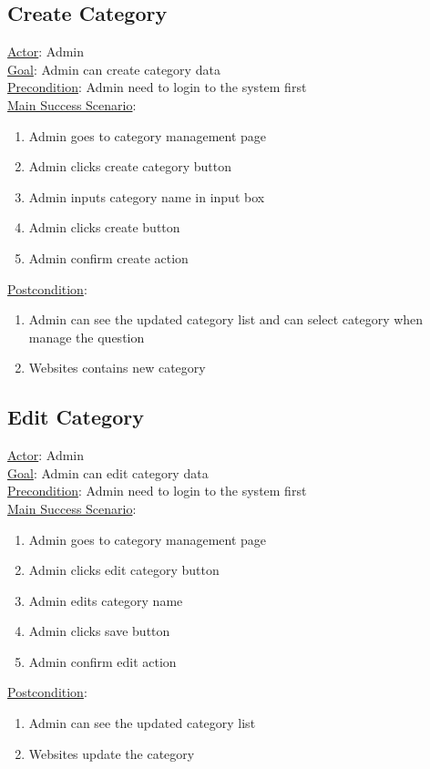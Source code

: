 \documentclass[12pt,oneside,openright,a4paper]{cpe-english-project}
\begin{document}
\subsection{Create Category}
\underline{Actor}: Admin\\
\underline{Goal}: Admin can create category data\\
\underline{Precondition}: Admin need to login to the system first\\
\underline{Main Success Scenario}:
\begin{enumerate}[label={\arabic*.}]
	\item Admin goes to category management page
	\item Admin clicks create category button
	\item Admin inputs category name in input box
	\item Admin clicks create button
	\item Admin confirm create action
\end{enumerate}
\underline{Postcondition}: 
\begin{enumerate}[label={\arabic*.}]
	\item Admin can see the updated category list and can select category when manage the question
	\item Websites contains new category
\end{enumerate}

\subsection{Edit Category}
\underline{Actor}: Admin\\
\underline{Goal}: Admin can edit category data\\
\underline{Precondition}: Admin need to login to the system first\\
\underline{Main Success Scenario}:
\begin{enumerate}[label={\arabic*.}]
	\item Admin goes to category management page
	\item Admin clicks edit category button
	\item Admin edits category name
	\item Admin clicks save button
	\item Admin confirm edit action
\end{enumerate}
\underline{Postcondition}: 
\begin{enumerate}[label={\arabic*.}]
	\item Admin can see the updated category list
	\item Websites update the category
\end{enumerate}
\end{document}
